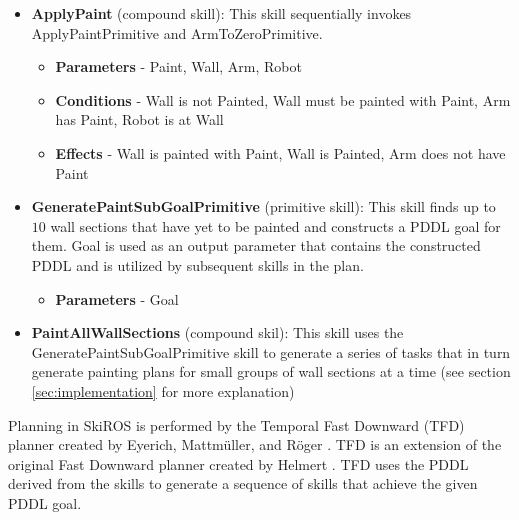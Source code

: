 \begin{itemize}
    \item {\bf ApplyPaint} (compound skill): This skill sequentially invokes ApplyPaintPrimitive and ArmToZeroPrimitive.
    \begin{itemize}
        \item {\bf Parameters} - Paint, Wall, Arm, Robot
        \item {\bf Conditions} - Wall is not Painted, Wall must be painted with Paint, Arm has Paint, Robot is at Wall
        \item {\bf Effects} - Wall is painted with Paint, Wall is Painted, Arm does not have Paint
    \end{itemize}
    
    \item {\bf GeneratePaintSubGoalPrimitive} (primitive skill): This skill finds up to $10$ wall sections that have yet to be painted and constructs a PDDL goal for them. Goal is used as an output parameter that contains the constructed PDDL and is utilized by subsequent skills in the plan.
    \begin{itemize}
        \item {\bf Parameters} - Goal
    \end{itemize}
    
    \item {\bf PaintAllWallSections} (compound skil): This skill uses the GeneratePaintSubGoalPrimitive skill to generate a series of tasks that in turn generate painting plans for small groups of wall sections at a time (see section \ref{sec:implementation} for more explanation)
\end{itemize}

Planning in SkiROS is performed by the Temporal Fast Downward (TFD) planner created by Eyerich, Mattm{\"u}ller, and R{\"o}ger \cite{eyerich2009using}. TFD is an extension of the original Fast Downward planner created by Helmert \cite{helmert2006fast}. TFD uses the PDDL derived from the skills to generate a sequence of skills that achieve the given PDDL goal. %

